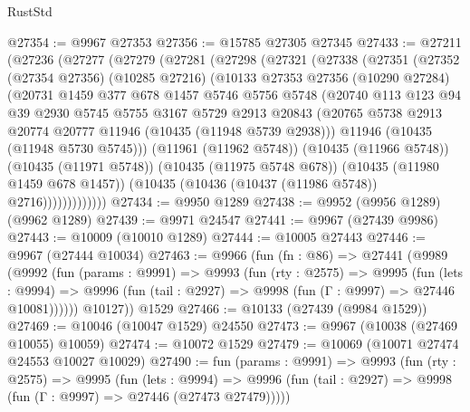 \begin{lexlean}{RustStd}
\begin{coremodule}
@27354 := @9967 @27353
@27356 := @15785 @27305 @27345
@27433 := @27211
    (@27236
      (@27277
        (@27279
          (@27281
            (@27298
              (@27321
                (@27338
                  (@27351
                    (@27352
                      (@27354 @27356)
                      (@10285 @27216)
                      (@10133
                        @27353
                        @27356
                        (@10290 @27284)
                        (@20731
                          @1459
                          @377
                          @678
                          @1457
                          @5746
                          @5756
                          @5748
                          (@20740
                            @113
                            @123
                            @94
                            @39
                            @2930
                            @5745
                            @5755
                            @3167
                            @5729
                            @2913
                            @20843
                            (@20765 @5738 @2913 @20774 @20777 @11946 (@10435 (@11948 @5739 @2938)))
                            @11946
                            (@10435 (@11948 @5730 @5745)))
                          (@11961 (@11962 @5748))
                          (@10435 (@11966 @5748))
                          (@10435 (@11971 @5748))
                          (@10435 (@11975 @5748 @678))
                          (@10435 (@11980 @1459 @678 @1457))
                          (@10435 (@10436 (@10437 (@11986 @5748)) @2716)))))))))))))
@27434 := @9950 @1289
@27438 := @9952 (@9956 @1289) (@9962 @1289)
@27439 := @9971 @24547
@27441 := @9967 (@27439 @9986)
@27443 := @10009 (@10010 @1289)
@27444 := @10005 @27443
@27446 := @9967 (@27444 @10034)
@27463 := @9966
    (fun (fn : @86) =>
    @27441
      (@9989
        (@9992
          (fun (params : @9991) =>
          @9993
            (fun (rty : @2575) =>
            @9995
              (fun (lets : @9994) =>
              @9996 (fun (tail : @2927) => @9998 (fun (Γ : @9997) => @27446 @10081))))))
        @10127))
    @1529
@27466 := @10133 (@27439 (@9984 @1529))
@27469 := @10046 (@10047 @1529) @24550
@27473 := @9967 (@10038 (@27469 @10055) @10059)
@27474 := @10072 @1529
@27479 := @10069 (@10071 @27474 @24553 @10027 @10029)
@27490 := fun (params : @9991) =>
  @9993
    (fun (rty : @2575) =>
    @9995
      (fun (lets : @9994) =>
      @9996 (fun (tail : @2927) => @9998 (fun (Γ : @9997) => @27446 (@27473 @27479)))))

\end{coremodule}
\end{lexlean}
